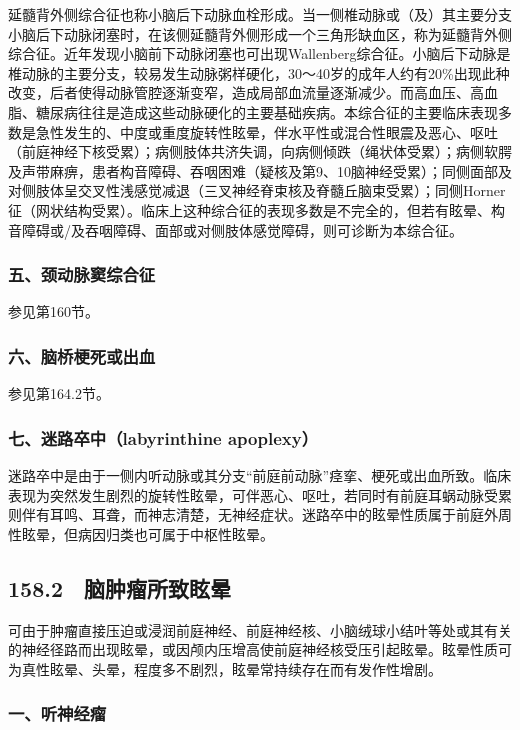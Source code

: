 延髓背外侧综合征也称小脑后下动脉血栓形成。当一侧椎动脉或（及）其主要分支小脑后下动脉闭塞时，在该侧延髓背外侧形成一个三角形缺血区，称为延髓背外侧综合征。近年发现小脑前下动脉闭塞也可出现Wallenberg综合征。小脑后下动脉是椎动脉的主要分支，较易发生动脉粥样硬化，30～40岁的成年人约有20\%出现此种改变，后者使得动脉管腔逐渐变窄，造成局部血流量逐渐减少。而高血压、高血脂、糖尿病往往是造成这些动脉硬化的主要基础疾病。本综合征的主要临床表现多数是急性发生的、中度或重度旋转性眩晕，伴水平性或混合性眼震及恶心、呕吐（前庭神经下核受累）；病侧肢体共济失调，向病侧倾跌（绳状体受累）；病侧软腭及声带麻痹，患者构音障碍、吞咽困难（疑核及第9、10脑神经受累）；同侧面部及对侧肢体呈交叉性浅感觉减退（三叉神经脊束核及脊髓丘脑束受累）；同侧Horner征（网状结构受累）。临床上这种综合征的表现多数是不完全的，但若有眩晕、构音障碍或/及吞咽障碍、面部或对侧肢体感觉障碍，则可诊断为本综合征。

\subsubsection{五、颈动脉窦综合征}

参见第160节。

\subsubsection{六、脑桥梗死或出血}

参见第164.2节。

\subsubsection{七、迷路卒中（labyrinthine apoplexy）}

迷路卒中是由于一侧内听动脉或其分支“前庭前动脉”痉挛、梗死或出血所致。临床表现为突然发生剧烈的旋转性眩晕，可伴恶心、呕吐，若同时有前庭耳蜗动脉受累则伴有耳鸣、耳聋，而神志清楚，无神经症状。迷路卒中的眩晕性质属于前庭外周性眩晕，但病因归类也可属于中枢性眩晕。

\subsection{158.2　脑肿瘤所致眩晕}

可由于肿瘤直接压迫或浸润前庭神经、前庭神经核、小脑绒球小结叶等处或其有关的神经径路而出现眩晕，或因颅内压增高使前庭神经核受压引起眩晕。眩晕性质可为真性眩晕、头晕，程度多不剧烈，眩晕常持续存在而有发作性增剧。

\subsubsection{一、听神经瘤}

